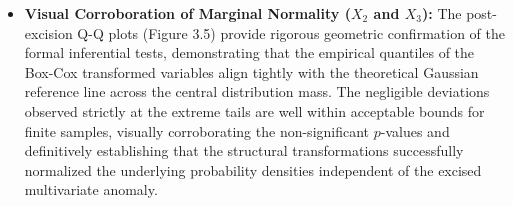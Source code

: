 \begin{itemize}
    \item \textbf{Visual Corroboration of Marginal Normality ($X_2$ and $X_3$):} The post-excision Q-Q plots (Figure 3.5) provide rigorous geometric confirmation of the formal inferential tests, demonstrating that the empirical quantiles of the Box-Cox transformed variables align tightly with the theoretical Gaussian reference line across the central distribution mass. The negligible deviations observed strictly at the extreme tails are well within acceptable bounds for finite samples, visually corroborating the non-significant $p$-values and definitively establishing that the structural transformations successfully normalized the underlying probability densities independent of the excised multivariate anomaly.
\end{itemize}